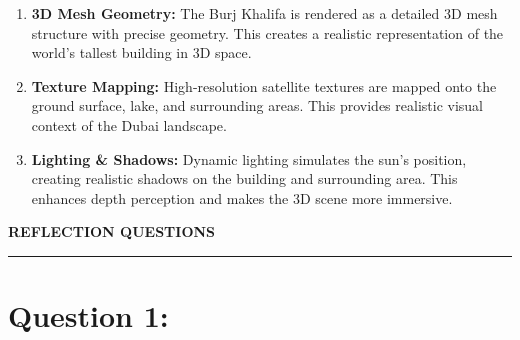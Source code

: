\documentclass[landscape,12pt,a4paper]{article}
\begin{document}
\vspace{0.04cm}


\begin{enumerate}[
    label=\textbf{\arabic*.},
    leftmargin=0.85cm,
    rightmargin=0.45cm,
    nosep,
    itemsep=0.07cm
]

    \item
    \textbf{3D Mesh Geometry:}
    The Burj Khalifa is rendered as a detailed 3D mesh structure
    with precise geometry. This creates a realistic representation
    of the world's tallest building in 3D space.

    \item
    \textbf{Texture Mapping:}
    High-resolution satellite textures are mapped onto the ground
    surface, lake, and surrounding areas. This provides realistic
    visual context of the Dubai landscape.

    \item
    \textbf{Lighting \& Shadows:}
    Dynamic lighting simulates the sun's position, creating realistic
    shadows on the building and surrounding area. This enhances
    depth perception and makes the 3D scene more immersive.

\end{enumerate}


\newpage

\begin{center}

    {\Large\bfseries\color{titleBlue}
    REFLECTION QUESTIONS}

    \vspace{0.06cm}

    \rule{0.80\textwidth}{0.5pt}

    \vspace{0.15cm}

\end{center}


\section*{Question 1:}
\end{document}
